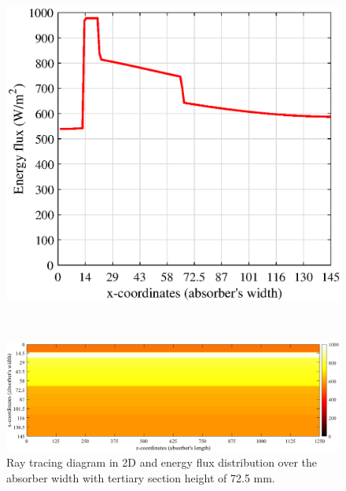 \begin{figure}[ht!]
\begin{minipage}{0.48\columnwidth}
	\end{minipage}
	\begin{minipage}{0.48\columnwidth}
		\includegraphics[scale=0.48]{figs/Energy2D-hts72.eps}
	\end{minipage}
	\\[3mm]
	\begin{minipage}{1.0\columnwidth}
		\includegraphics[scale=0.41]{figs/Energy3D-hts72.png}
	\end{minipage}
	
	\caption{Ray tracing diagram in 2D and energy flux distribution over the absorber width with tertiary section height of 72.5 mm.}
	\label{Tertiary-hts72}
\end{figure}

